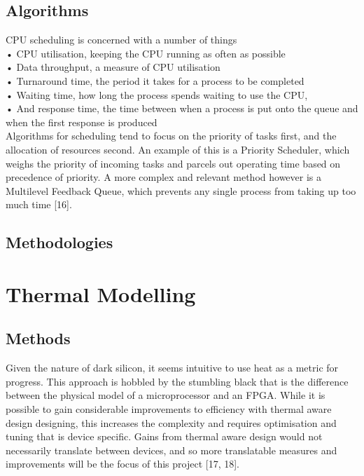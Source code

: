 		\subsection{Algorithms}
			CPU scheduling is concerned with a number of things\\
			• CPU utilisation, keeping the CPU running as often as possible\\
			• Data throughput, a measure of CPU utilisation\\
			• Turnaround time, the period it takes for a process to be completed\\
			• Waiting time, how long the process spends waiting to use the CPU,\\
			• And response time, the time between when a process is put onto the queue and when the first response is produced\\
			Algorithms for scheduling tend to focus on the priority of tasks first, and the allocation of resources second. An example of this is a Priority Scheduler, which weighs the priority of incoming tasks and parcels out operating time based on precedence of priority. A more complex and relevant method however is a Multilevel Feedback Queue, which prevents any single process from taking up too much time [16].
		
		\subsection{Methodologies}
			
		
	
	\section{Thermal Modelling}
		\subsection{Methods}
			Given the nature of dark silicon, it seems intuitive to use heat as a metric for progress. This approach is hobbled by the stumbling black that is the difference between the physical model of a microprocessor and an FPGA. While it is possible to gain considerable improvements to efficiency with thermal aware design designing, this increases the complexity and requires optimisation and tuning that is device specific. Gains from thermal aware design would not necessarily translate between devices, and so more translatable measures and improvements will be the focus of this project [17, 18].
		
